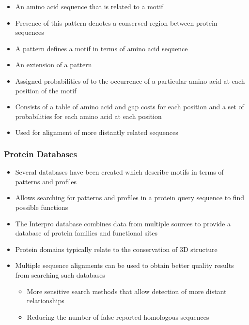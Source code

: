 \documentclass[a4paper]{article}
\begin{document}

\begin{itemize}
  \item
    An amino acid sequence that is related to a motif

  \item
    Presence of this pattern denotes a conserved region between protein
    sequences

  \item
    A pattern defines a motif in terms of amino acid sequence
\end{itemize}


\begin{itemize}
  \item
    An extension of a pattern

  \item
    Assigned probabilities of to the occurrence of a particular amino acid at
    each position of the motif

  \item
    Consists of a table of amino acid and gap costs for each position and a set
    of probabilities for each amino acid at each position

  \item
    Used for alignment of more distantly related sequences
\end{itemize}

\subsubsection{Protein Databases}

\begin{itemize}
  \item
    Several databases have been created which describe motifs in terms of
    patterns and profiles

  \item
    Allows searching for patterns and profiles in a protein query sequence to
    find possible functions

  \item
    The Interpro database combines data from multiple sources to provide a
    database of protein families and functional sites

  \item
    Protein domains typically relate to the conservation of 3D structure

  \item
    Multiple sequence alignments can be used to obtain better quality results
    from searching such databases

    \begin{itemize}
      \item
        More sensitive search methods that allow detection of more distant
        relationships

      \item
        Reducing the number of false reported homologous sequences
    \end{itemize}
\end{itemize}
\end{document}
